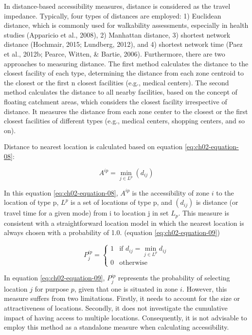 \documentclass[
11pt, %
oneside, %
english, %
singlespacing, %
]{macthesis} %
\begin{document}
In distance-based accessibility measures, distance is considered as the travel impedance. Typically, four types of distances are employed: 1) Euclidean distance, which is commonly used for walkability assessments, especially in health studies (Apparicio et al., 2008), 2) Manhattan distance, 3) shortest network distance (Hochmair, 2015; Lundberg, 2012), and 4) shortest network time (Paez et al., 2012b; Pearce, Witten, \& Bartie, 2006). Furthermore, there are two approaches to measuring distance. The first method calculates the distance to the closest facility of each type, determining the distance from each zone centroid to the closest or the first n closest facilities (e.g., medical centers). The second method calculates the distance to all nearby facilities, based on the concept of floating catchment areas, which considers the closest facility irrespective of distance. It measures the distance from each zone center to the closest or the first closest facilities of different types (e.g., medical centers, shopping centers, and so on).

Distance to nearest location is calculated based on equation \ref{eq:ch02-equation-08}:

\begin{equation}
A^{ip} = \min_{j \in L^p} (d_{ij})
\label{eq:ch02-equation-08}
\end{equation}

In this equation \ref{eq:ch02-equation-08}, \(A^{ip}\) is the accessibility of zone \(i\) to the location of type p, \(L^p\) is a set of locations of type p, and \((d_{ij})\) is distance (or travel time for a given mode) from i to location j in set \(L_p\). This measure is consistent with a straightforward location model in which the nearest location is always chosen with a probability of 1.0. (equation \ref{eq:ch02-equation-09})

\begin{equation}
P^{ip}_j = 
\begin{cases}
  1 & \text{if } d_{ij} = \min_{j \in L^p} d_{ij} \\
  0 & \text{otherwise}
\end{cases}
\label{eq:ch02-equation-09}
\end{equation}

In equation \ref{eq:ch02-equation-09}, \(P_j^{ip}\) represents the probability of selecting location \(j\) for purpose \(p\), given that one is situated in zone \(i\). However, this measure suffers from two limitations. Firstly, it needs to account for the size or attractiveness of locations. Secondly, it does not investigate the cumulative impact of having access to multiple locations. Consequently, it is not advisable to employ this method as a standalone measure when calculating accessibility.
\end{document}
